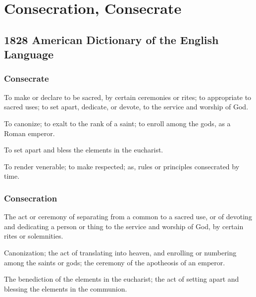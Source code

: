 \section{Consecration, Consecrate}
	\label{CONSECRATION}
	

\subsection{1828 American Dictionary of the English Language} %
	\label{CONSECRATION-1828}
	
	\subsubsection{Consecrate}

		\begin{compactitem}
			\item[1] To make or declare to be sacred, by certain ceremonies or rites; to appropriate to sacred uses; to set apart, dedicate, or devote, to the service and worship of God.
			\item[2] To canonize; to exalt to the rank of a saint; to enroll among the gods, as a Roman emperor.
			\item[3] To set apart and bless the elements in the eucharist.
			\item[4] To render venerable; to make respected; as, rules or principles consecrated by time.
		\end{compactitem}
		
	\subsubsection{Consecration}
	
		\begin{compactitem}
			\item[1] The act or ceremony of separating from a common to a sacred use, or of devoting and dedicating a person or thing to the service and worship of God, by certain rites or solemnities.
			\item[2] Canonization; the act of translating into heaven, and enrolling or numbering among the saints or gods; the ceremony of the apotheosis of an emperor.
			\item[3] The benediction of the elements in the eucharist; the act of setting apart and blessing the elements in the communion.
		\end{compactitem}

